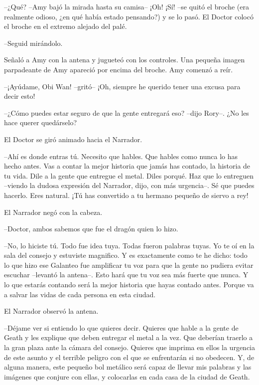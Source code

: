 {--¿Qué? --Amy bajó la mirada hasta su camisa-- ¡Oh! ¡Sí! --se quitó
	el broche (era realmente odioso, ¿en qué había estado pensando?) y se lo
pasó. El Doctor colocó el broche en el extremo alejado del palé.}

{--Seguid mirándolo.}

{Señaló a Amy con la antena y jugueteó con los controles. Una pequeña
	imagen parpadeante de Amy apareció por encima del broche. Amy comenzó a
reír.}

{--¡Ayúdame, Obi Wan! --gritó-- ¡Oh, siempre he querido tener una
excusa para decir esto!}

{--¿Cómo puedes estar seguro de que la gente entregará eso? --dijo
Rory--. ¿No les hace querer quedárselo?}

{El Doctor se giró animado hacia el Narrador.}

{--Ahí es donde entras tú. Necesito que hables. Que hables como nunca
	lo has hecho antes. Vas a contar la mejor historia que jamás has
	contado, la historia de tu vida. Dile a la gente que entregue el metal.
	Diles porqué. Haz que lo entreguen --viendo la dudosa expresión del
	Narrador, dijo, con más urgencia--. Sé que puedes hacerlo. Eres natural.
¡Tú has convertido a tu hermano pequeño de siervo a rey!}

{El Narrador negó con la cabeza.}

{--Doctor, ambos sabemos que fue el dragón quien lo hizo.}

{--No, lo hiciste tú. Todo fue idea tuya. Todas fueron palabras tuyas.
	Yo te oí en la sala del consejo y estuviste magnifico. Y es exactamente
	como te he dicho: todo lo que hizo ese Galanteo fue amplificar tu voz
	para que la gente no pudiera evitar escuchar --levantó la antena--. Esto
	hará que tu voz sea más fuerte que nunca. Y lo que estarás contando será
	la mejor historia que hayas contado antes. Porque va a salvar las vidas
de cada persona en esta ciudad.}

{El Narrador observó la antena.}

{--Déjame ver si entiendo lo que quieres decir. Quieres que hable a la
	gente de Geath y les explique que deben entregar el metal a la vez. Que
	deberían traerlo a la gran plaza ante la cámara del consejo. Quieres que
	imprima en ellos la urgencia de este asunto y el terrible peligro con el
	que se enfrentarán si no obedecen. Y, de alguna manera, este pequeño bol
	metálico será capaz de llevar mis palabras y las imágenes que conjure
con ellas, y colocarlas en cada casa de la ciudad de Geath.}

